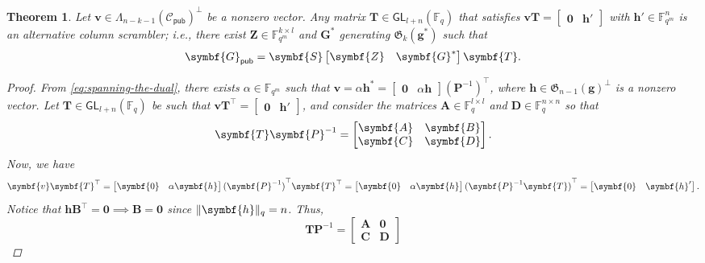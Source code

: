 \documentclass[version=last, paper=A4, parskip=half, oneside,%
toc=bibliography, toc=listof, listof=leveldown]{scrbook}
\theoremstyle{plain}
\newtheorem{theorem}{Theorem}
\theoremstyle{definition}
\theoremstyle{remark}
\renewcommand*{\vec}{\symbf}
\newcommand*{\mat}{\symbf}
\newcommand*{\trans}{\top}%
\newcommand*{\GL}{\ensuremath{\mathsf{GL}}}
\newcommand*{\pub}{\ensuremath{\mathsf{pub}}}
\newcommand*{\FF}{\ensuremath{\mathbb{F}}}
\newcommand*{\Gab}{\ensuremath{\mathfrak{G}}}
\DeclarePairedDelimiter{\norm}{\lVert}{\rVert}
\newcommand*{\normR}[2]{\ensuremath{\norm{#1}_{#2}}}
\begin{document}
\begin{theorem}
  Let \(\vec{v} \in {\Lambda_{n - k - 1}(\mathcal{C}_{\pub})}^{\perp}\) be a
  nonzero vector.  Any matrix \(\mat{T} \in \GL_{l + n}(\FF_q)\) that satisfies
  \(\vec{v} \mat{T} = \begin{bmatrix} \vec{0} & \vec{h}' \end{bmatrix}\) with
  \(\vec{h}' \in \FF_{q^m}^n\) is an alternative column scrambler; i.e., there
  exist \(\mat{Z} \in \FF_{q^m}^{k \times l}\) and \(\mat{G}^*\) generating
  \(\Gab_k(\vec{g}^*)\) such that
  \[
    \mat{G}_{\pub} = \mat{S} \begin{bmatrix} \mat{Z} & \mat{G}^* \end{bmatrix} \mat{T}\text.
  \]
  \begin{proof}
    From \cref{eq:spanning-the-dual}, there exists \(\alpha \in \FF_{q^m}\) such
    that
    \(\vec{v} = \alpha \vec{h}^* = \begin{bmatrix} \vec{0} & \alpha \vec{h} \end{bmatrix} {(\mat{P}^{-1})}^{\trans}\),
    where \(\vec{h} \in {\Gab_{n - 1}(\vec{g})}^{\perp}\) is a nonzero vector.
    Let \(\mat{T} \in \GL_{l + n}(\FF_q)\) be such that
    \(\vec{v} \mat{T}^{\trans} = \begin{bmatrix} \vec{0} & \vec{h}' \end{bmatrix}\),
    and consider the matrices \(\mat{A} \in \FF_q^{l \times l}\) and
    \(\mat{D} \in \FF_q^{n \times n}\) so that
    \[
      \mat{T} \mat{P}^{-1} =
      \begin{bmatrix}
        \mat{A} & \mat{B} \\
        \mat{C} & \mat{D}
      \end{bmatrix}\text.
    \]
    Now, we have
    \[
      \vec{v} \mat{T}^{\trans} =
      \begin{bmatrix} \vec{0} & \alpha \vec{h} \end{bmatrix}
      {(\mat{P}^{-1})}^{\trans} \mat{T}^{\trans} =
      \begin{bmatrix} \vec{0} & \alpha \vec{h} \end{bmatrix}
      {(\mat{P}^{-1} \mat{T})}^{\trans} =
      \begin{bmatrix} \vec{0} & \vec{h}' \end{bmatrix}\text.
    \]
    Notice that
    \(\vec{h} \mat{B}^{\trans} = \vec{0} \implies \mat{B} = \mat{0}\) since
    \(\normR{\vec{h}}{q} = n\).  Thus,
    \[
      \mat{T} \mat{P}^{-1} =
      \begin{bmatrix} \mat{A} & \mat{0} \\ \mat{C} & \mat{D} \end{bmatrix}
\]
\end{proof}
\end{theorem}
\end{document}
